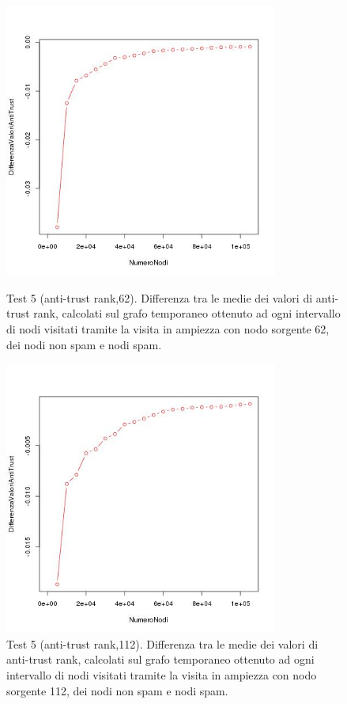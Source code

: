 \begin{figure}
 \centering
 \includegraphics[height=9cm]{immagini/test5/averageTest_antitrust_62}
  \caption{Test 5 (anti-trust rank,62). Differenza tra le medie dei valori di anti-trust rank, calcolati sul grafo temporaneo ottenuto ad ogni intervallo di nodi visitati tramite la visita in ampiezza con nodo sorgente 62, dei nodi non spam e nodi spam.}
 \label{fig:test5antitrust62}
  \centering
 \includegraphics[height=9cm]{immagini/test5/averageTest_antitrust_112}
  \caption{Test 5 (anti-trust rank,112). Differenza tra le medie dei valori di anti-trust rank, calcolati sul grafo temporaneo ottenuto ad ogni intervallo di nodi visitati tramite la visita in ampiezza con nodo sorgente 112, dei nodi non spam e nodi spam.}
 \label{fig:test5antitrust112}
\end{figure}


